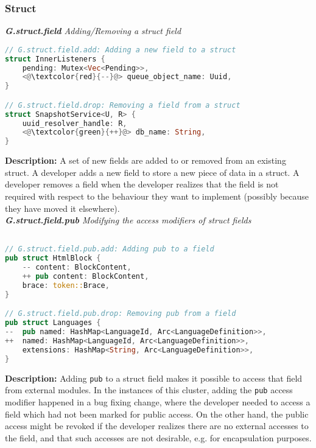 \subsubsection{Struct} 
\noindent\textit{\textbf{G.struct.field} Adding/Removing a struct field}

\begin{lstlisting}[language=Rust, style=colouredRust]
// G.struct.field.add: Adding a new field to a struct
struct InnerListeners {
    pending: Mutex<Vec<Pending>>,
    <@\textcolor{red}{--}@> queue_object_name: Uuid,
}

// G.struct.field.drop: Removing a field from a struct
struct SnapshotService<U, R> {
    uuid_resolver_handle: R,
    <@\textcolor{green}{++}@> db_name: String,
}
\end{lstlisting}

\noindent\textbf{Description:} A set of new fields are added to or removed from an existing struct. A developer adds a new field to store a new piece of data in a struct. A developer removes a field when the developer realizes that the field is not required with respect to the behaviour they want to implement (possibly because they have moved it elsewhere). \\

\noindent\textit{\textbf{G.struct.field.pub} Modifying the access modifiers of struct fields}

\begin{lstlisting}[language=Rust, style=colouredRust]

// G.struct.field.pub.add: Adding pub to a field
pub struct HtmlBlock {
    -- content: BlockContent,
    ++ pub content: BlockContent,
    brace: token::Brace,
} 

// G.struct.field.pub.drop: Removing pub from a field
pub struct Languages {
--  pub named: HashMap<LanguageId, Arc<LanguageDefinition>>,
++  named: HashMap<LanguageId, Arc<LanguageDefinition>>,
    extensions: HashMap<String, Arc<LanguageDefinition>>,
}

\end{lstlisting}

\noindent\textbf{Description:} Adding \texttt{pub} to a struct field makes it possible to access that field from external modules. In the instances of this cluster, adding the \texttt{pub} access modifier happened in a bug fixing change, where the developer needed to access a field which had not been marked for public access. On the other hand, the public access might be revoked if the developer realizes there are no external accesses to the field, and that such accesses are not desirable, e.g. for encapsulation purposes.

